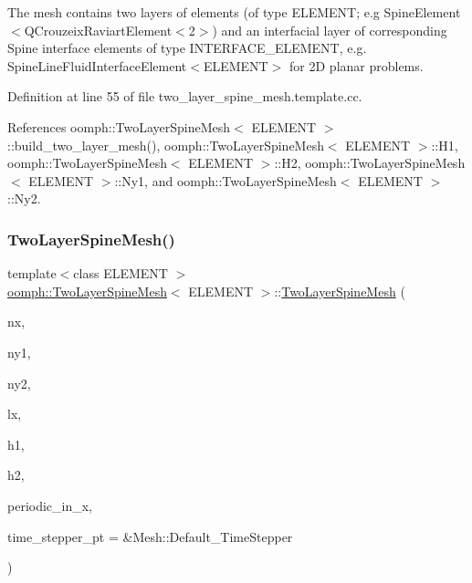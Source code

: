 The mesh contains two layers of elements (of type E\+L\+E\+M\+E\+NT; e.\+g Spine\+Element$<$Q\+Crouzeix\+Raviart\+Element$<$2$>$) and an interfacial layer of corresponding Spine interface elements of type I\+N\+T\+E\+R\+F\+A\+C\+E\+\_\+\+E\+L\+E\+M\+E\+NT, e.\+g. Spine\+Line\+Fluid\+Interface\+Element$<$\+E\+L\+E\+M\+E\+N\+T$>$ for 2D planar problems. 

Definition at line 55 of file two\+\_\+layer\+\_\+spine\+\_\+mesh.\+template.\+cc.



References oomph\+::\+Two\+Layer\+Spine\+Mesh$<$ E\+L\+E\+M\+E\+N\+T $>$\+::build\+\_\+two\+\_\+layer\+\_\+mesh(), oomph\+::\+Two\+Layer\+Spine\+Mesh$<$ E\+L\+E\+M\+E\+N\+T $>$\+::\+H1, oomph\+::\+Two\+Layer\+Spine\+Mesh$<$ E\+L\+E\+M\+E\+N\+T $>$\+::\+H2, oomph\+::\+Two\+Layer\+Spine\+Mesh$<$ E\+L\+E\+M\+E\+N\+T $>$\+::\+Ny1, and oomph\+::\+Two\+Layer\+Spine\+Mesh$<$ E\+L\+E\+M\+E\+N\+T $>$\+::\+Ny2.

\mbox{\label{classoomph_1_1TwoLayerSpineMesh_a8787a305ee929d001542464529e23787}} 
\subsubsection{\texorpdfstring{Two\+Layer\+Spine\+Mesh()}{TwoLayerSpineMesh()}\hspace{0.1cm}{\footnotesize\ttfamily [2/3]}}
{\footnotesize\ttfamily template$<$class E\+L\+E\+M\+E\+NT $>$ \\
\hyperlink{classoomph_1_1TwoLayerSpineMesh}{oomph\+::\+Two\+Layer\+Spine\+Mesh}$<$ E\+L\+E\+M\+E\+NT $>$\+::\hyperlink{classoomph_1_1TwoLayerSpineMesh}{Two\+Layer\+Spine\+Mesh} (\begin{DoxyParamCaption}\item[{const unsigned \&}]{nx,  }\item[{const unsigned \&}]{ny1,  }\item[{const unsigned \&}]{ny2,  }\item[{const double \&}]{lx,  }\item[{const double \&}]{h1,  }\item[{const double \&}]{h2,  }\item[{const bool \&}]{periodic\+\_\+in\+\_\+x,  }\item[{Time\+Stepper $\ast$}]{time\+\_\+stepper\+\_\+pt = {\ttfamily \&Mesh\+:\+:Default\+\_\+TimeStepper} }\end{DoxyParamCaption})}



